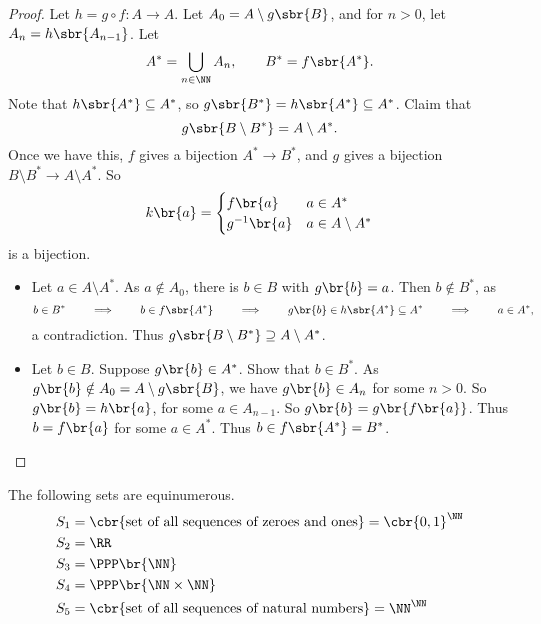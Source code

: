\begin{proof}
Let $ h = g \circ f : A \to A $. Let $ A_0 = A \setminus g\sbr{B} $, and for $ n > 0 $, let $ A_n = h\sbr{A_{n - 1}} $. Let
$$ A^* = \bigcup_{n \in \NN} A_n, \qquad B^* = f\sbr{A^*}. $$
Note that $ h\sbr{A^*} \subseteq A^* $, so $ g\sbr{B^*} = h\sbr{A^*} \subseteq A^* $. Claim that
$$ g\sbr{B \setminus B^*} = A \setminus A^*. $$
Once we have this, $ f $ gives a bijection $ A^* \to B^* $, and $ g $ gives a bijection $ B \setminus B^* \to A \setminus A^* $. So
$$ k\br{a} =
\begin{cases}
f\br{a} & a \in A^* \\
g^{-1}\br{a} & a \in A \setminus A^*
\end{cases}
$$
is a bijection.
\begin{itemize}
\item Let $ a \in A \setminus A^* $. As $ a \notin A_0 $, there is $ b \in B $ with $ g\br{b} = a $. Then $ b \notin B^* $, as
$$ b \in B^* \qquad \implies \qquad b \in f\sbr{A^*} \qquad \implies \qquad g\br{b} \in h\sbr{A^*} \subseteq A^* \qquad \implies \qquad a \in A^*, $$
a contradiction. Thus $ g\sbr{B \setminus B^*} \supseteq A \setminus A^* $.
\item Let $ b \in B $. Suppose $ g\br{b} \in A^* $. Show that $ b \in B^* $. As $ g\br{b} \notin A_0 = A \setminus g\sbr{B} $, we have $ g\br{b} \in A_n $ for some $ n > 0 $. So $ g\br{b} = h\br{a} $, for some $ a \in A_{n - 1} $. So $ g\br{b} = g\br{f\br{a}} $. Thus $ b = f\br{a} $ for some $ a \in A^* $. Thus $ b \in f\sbr{A^*} = B^* $.
\end{itemize}
\end{proof}

\begin{example}
The following sets are equinumerous.
\begin{align*}
S_1 & = \cbr{\text{set of all sequences of zeroes and ones}} = \cbr{0, 1}^\NN \\
S_2 & = \RR \\
S_3 & = \PPP\br{\NN} \\
S_4 & = \PPP\br{\NN \times \NN} \\
S_5 & = \cbr{\text{set of all sequences of natural numbers}} = \NN^\NN
\end{align*}
\end{example}

\pagebreak

